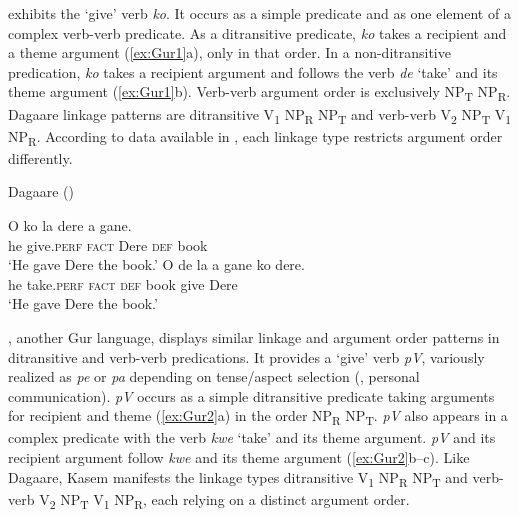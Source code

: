\documentclass[output=paper,colorlinks,citecolor=brown]{langscibook}
\begin{document}
 exhibits the ‘give’ verb \textit{ko}. It occurs as a simple predicate and as one element of a complex verb-verb predicate. As a ditransitive predicate, \textit{ko} takes a recipient and a theme argument (\ref{ex:Gur1}a), only in that order. In a non-ditransitive predication, \textit{ko} takes a recipient argument and follows the verb \textit{de} ‘take’ and its theme argument (\ref{ex:Gur1}b). Verb-verb argument order is exclusively NP\textsubscript{T} NP\textsubscript{R}. Dagaare linkage patterns are ditransitive V\textsubscript{1} NP\textsubscript{R} NP\textsubscript{T} and verb-verb V\textsubscript{2} NP\textsubscript{T} V\textsubscript{1} NP\textsubscript{R}. According to data available in \citet{Bodomo1997}, each linkage type restricts argument order differently.

\ea \label{ex:Gur1} Dagaare (\citealt[105]{Bodomo1997})
\begin{xlist}
\ex
\gll O			ko						la			dere		a			gane. \\
		he		give.\textsc{perf}	\textsc{fact}	Dere	\textsc{def}	book\\
\glt						‘He gave Dere the book.’
\ex
\gll O			de	la			a			gane	ko			dere.\\
he		take.\textsc{perf}	\textsc{fact}	\textsc{def}	book	give		Dere\\
\glt				‘He gave Dere the book.’
\end{xlist}
\z

, another Gur language, displays similar linkage and argument order patterns in ditransitive and verb-verb predications. It provides a ‘give’ verb \textit{pV}, variously  realized as \textit{pe} or \textit{pa} depending on tense/aspect selection (\citealt{Hewer1983, Nabaarese2013}, personal communication). \textit{pV} occurs as a simple ditransitive predicate taking arguments for recipient and theme (\ref{ex:Gur2}a) in the order NP\textsubscript{R} NP\textsubscript{T}. \textit{pV} also appears in a complex predicate with the verb \textit{kwe} ‘take’ and its theme argument. \textit{pV} and its recipient argument follow \textit{kwe} and its theme argument (\ref{ex:Gur2}b--c). Like Dagaare, Kasem manifests the linkage types ditransitive V\textsubscript{1} NP\textsubscript{R} NP\textsubscript{T} and verb-verb V\textsubscript{2} NP\textsubscript{T} V\textsubscript{1} NP\textsubscript{R}, each relying on a distinct argument order.
\end{document}
